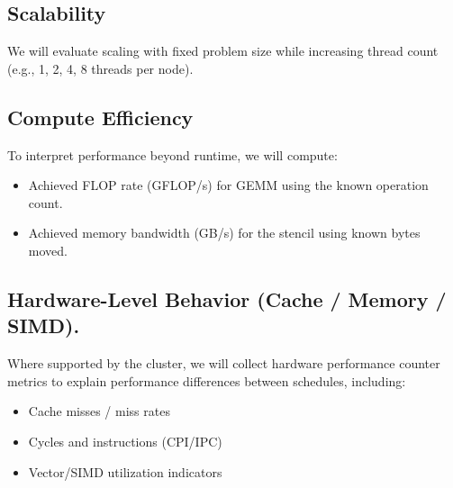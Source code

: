 \subsection*{Scalability}
 We will evaluate scaling with fixed problem size while increasing thread count (e.g., 1, 2, 4, 8 threads per node).

\subsection*{Compute Efficiency}
To interpret performance beyond runtime, we will compute:

\begin{itemize}
\item Achieved FLOP rate (GFLOP/s) for GEMM using the known operation count.
\item Achieved memory bandwidth (GB/s) for the stencil using known bytes moved.
\end{itemize}
 
\subsection*{Hardware-Level Behavior (Cache / Memory / SIMD).}
 Where supported by the cluster, we will collect hardware performance counter metrics to explain performance differences between schedules, including:
\begin{itemize}
    \item Cache misses / miss rates
    \item Cycles and instructions (CPI/IPC)
    \item Vector/SIMD utilization indicators
\end{itemize}

\cite{lattner2021mlir}
\cite{tavakkoli2023peak}
